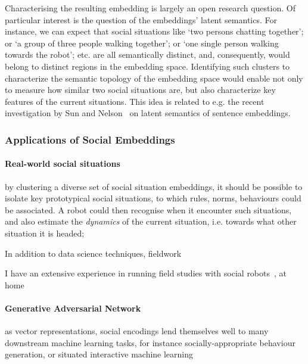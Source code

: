 Characterising the resulting embedding is largely an open research question. Of
particular interest is the question of the embeddings' latent semantics. For
instance, we can expect that social situations like `two persons chatting
together'; or `a group of three people walking together'; or `one single person
walking towards the robot'; etc. are all semantically distinct, and,
consequently, would belong to distinct regions in the embedding space.
Identifying such clusters to characterize the semantic topology of the embedding
space would enable not only to measure how similar two social situations are,
but also characterize key features of the current situations.  This idea is
related to e.g. the recent investigation by Sun and
Nelson~\cite{sun2023topological} on latent semantics of sentence embeddings.


\subsubsection{Applications of Social Embeddings}


\paragraph{Real-world social situations}

by clustering a diverse set of social situation embeddings, it should
be possible to isolate key prototypical social situations, to which
rules, norms, behaviours could be associated. A robot could then 
recognise when it encounter such situations, and also
estimate the \emph{dynamics} of the current situation, i.e. towards what
other situation it is headed;

In addition to data science techniques, fieldwork

I have an extensive experience in running field studies with social robots~\cite{hood2015when, lemaignan2016learning, jacq2016building,
        baxter2015wider,kennedy2016cautious,senft2018robots}, at home~\cite{mondada2015ranger}

\paragraph{Generative Adversarial Network}

as vector representations, social encodings lend themselves well to
        many downstream machine learning tasks, for instance socially-appropriate behaviour
        generation, or situated interactive machine learning

